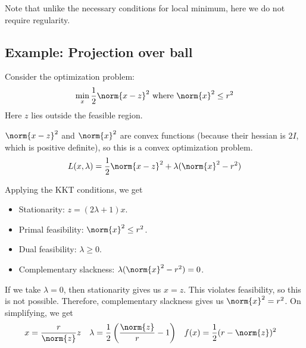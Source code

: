 Note that unlike the necessary conditions for local minimum,
here we do not require regularity.

\subsection{Example: Projection over ball}

Consider the optimization problem:
\[ \min_x \frac{1}{2} \norm{x-z}^2 \textrm{ where } \norm{x}^2 \le r^2 \]
Here $z$ lies outside the feasible region.

$\norm{x-z}^2$ and $\norm{x}^2$ are convex functions
(because their hessian is $2I$, which is positive definite),
so this is a convex optimization problem.
\[ L(x, \lambda) = \frac{1}{2}\norm{x-z}^2 + \lambda(\norm{x}^2 - r^2) \]

Applying the KKT conditions, we get
\begin{itemize}
\item Stationarity: $z = (2\lambda + 1)x$.
\item Primal feasibility: $\norm{x}^2 \le r^2$.
\item Dual feasibility: $\lambda \ge 0$.
\item Complementary slackness: $\lambda(\norm{x}^2 - r^2) = 0$.
\end{itemize}

If we take $\lambda = 0$, then stationarity gives us $x = z$.
This violates feasibility, so this is not possible.
Therefore, complementary slackness gives us $\norm{x}^2 = r^2$.
On simplifying, we get
\begin{align*}
x &= \frac{r}{\norm{z}}z
& \lambda &= \frac{1}{2}\left(\frac{\norm{z}}{r}-1\right)
& f(x) &= \frac{1}{2}(r - \norm{z})^2
\end{align*}


